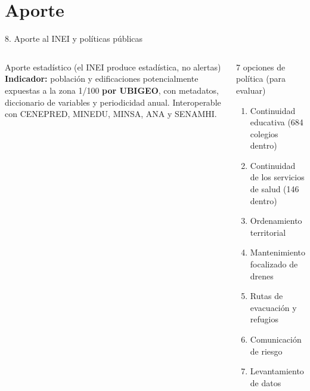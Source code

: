 \documentclass[aspectratio=169,11pt]{beamer}
\begin{document}
\section{Aporte}
\begin{frame}{8. Aporte al INEI y políticas públicas}
\begin{columns}[T]
\begin{block}{Aporte estadístico (el INEI produce estadística, no alertas)}\small
\textbf{Indicador:} población y edificaciones potencialmente expuestas a la zona 1/100 \textbf{por UBIGEO}, con metadatos, diccionario de variables y periodicidad anual. Interoperable con CENEPRED, MINEDU, MINSA, ANA y SENAMHI.
\end{block}
\begin{block}{7 opciones de política (para evaluar)}\small
\begin{enumerate}
\item Continuidad educativa (684 colegios dentro)
\item Continuidad de los servicios de salud (146 dentro)
\item Ordenamiento territorial
\item Mantenimiento focalizado de drenes
\item Rutas de evacuación y refugios
\item Comunicación de riesgo
\item Levantamiento de datos
\end{enumerate}
\end{block}
\end{columns}
\end{frame}

\end{document}
